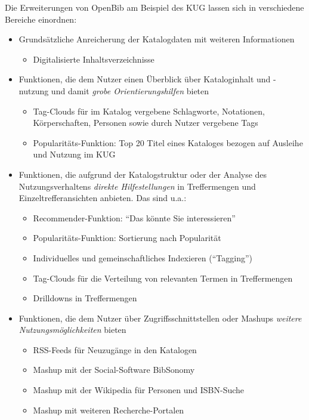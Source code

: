 \documentclass[11pt]{scrartcl}
\begin{document}
Die Erweiterungen von OpenBib am Beispiel des KUG lassen sich in
verschiedene Bereiche einordnen:
\begin{itemize}
\item Grundsätzliche Anreicherung der Katalogdaten mit weiteren
  Informationen
  \begin{itemize}
  \item Digitalisierte Inhaltsverzeichnisse
  \end{itemize}
\item Funktionen, die dem Nutzer einen Überblick über Kataloginhalt
  und -nutzung und damit \emph{grobe Orientierungshilfen} bieten
  \begin{itemize}
  \item Tag-Clouds für im Katalog vergebene Schlagworte, Notationen,
    Körperschaften, Personen sowie durch Nutzer vergebene Tags
  \item Popularitäts-Funktion: Top 20 Titel eines Kataloges bezogen
    auf Ausleihe und Nutzung im KUG
  \end{itemize}
\item Funktionen, die aufgrund der Katalogstruktur oder der Analyse
  des Nutzungsverhaltens \emph{direkte Hilfestellungen} in Treffermengen und
  Einzeltrefferansichten anbieten. Das sind u.a.:
  \begin{itemize}
  \item Recommender-Funktion: "`Das könnte Sie interessieren"'
  \item Popularitäts-Funktion: Sortierung nach Popularität
  \item Individuelles und gemeinschaftliches Indexieren ("`Tagging"')
  \item Tag-Clouds für die Verteilung von relevanten Termen in Treffermengen
  \item Drilldowns in Treffermengen
  \end{itemize}
\item Funktionen, die dem Nutzer über Zugriffsschnittstellen oder
  Mashups \emph{weitere Nutzungs\-mög\-lich\-kei\-ten} bieten
  \begin{itemize}
  \item RSS-Feeds für Neuzugänge in den Katalogen
  \item Mashup mit der Social-Software BibSonomy
  \item Mashup mit der Wikipedia für Personen und ISBN-Suche
  \item Mashup mit weiteren Recherche-Portalen
  \end{itemize}
\end{itemize}
\end{document}
